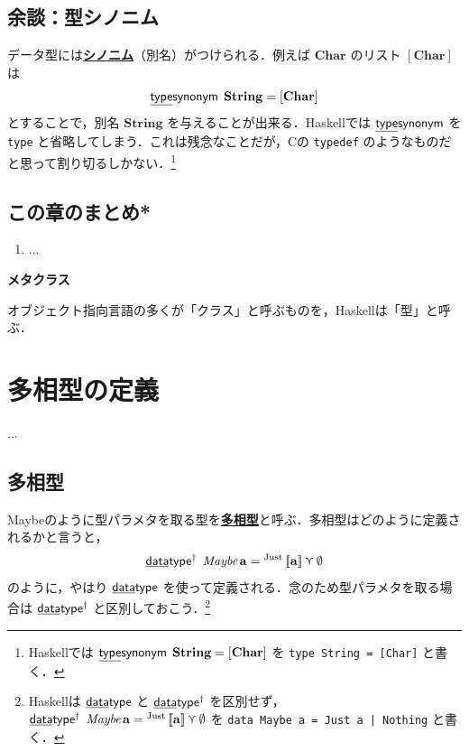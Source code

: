 \documentclass[a4paper,twocolumn]{jsbook}
\def\[{\left[\!\left[}
\def\]{\right]\!\right]}
\newcommand{\programminglanguage}[1]{\textsf{#1}}
\newcommand{\clang}{\programminglanguage{C}}
\newcommand{\haskell}{\programminglanguage{Haskell}}
\newenvironment{note}[1]{\begin{boxnote}\begin{center}\textbf{#1}\end{center}}{\end{boxnote}}
\newcommand{\keyword}[1]{{\underline{\textbf{#1}}}}
\newcommand{\code}[1]{\texttt{#1}}
\newcommand{\mKeyword}[1]{\mathsf{#1}} %
\newcommand{\mKeywordUnderline}[1]{\text{\underline{\textsf{#1}}}} %
\newcommand{\mDataTypeKeyword}{\mKeywordUnderline{data}\mKeyword{type}}
\newcommand{\mTypeSynonymKeyword}{\mKeywordUnderline{type}\mKeyword{synonym}}
\DeclareMathOperator{\mDataType}{\mDataTypeKeyword}
\DeclareMathOperator{\mDataTypeParametric}{\mDataTypeKeyword^\dagger}
\DeclareMathOperator{\mTypeSynonym}{\mTypeSynonymKeyword}
\newcommand{\mNothing}{\emptyset}
\DeclareMathOperator{\mValueOr}{\curlyvee}
\newcommand{\mType}[1]{\mathbf{#1}}
\newcommand{\mCharType}{\mType{Char}}
\newcommand{\mStringType}{\mType{String}}
\newcommand{\mListType}[1]{[\mType{#1}]}
\newcommand{\mTypeConstructor}[1]{\textit{#1}}
\DeclareMathOperator{\mMaybeTypeConstructor}{\mTypeConstructor{Maybe}}
\newcommand{\mGenericTypeAssemble}[2]{{}^{\mTypeConstructor{#1}}\[\mType{#2}\]}
\newcommand{\mMaybeType}[1]{\mGenericTypeAssemble{Maybe}{#1}}
\newcommand{\mGenericValueConstructor}[1]{\mathrm{#1}}
\newcommand{\mGenericWith}[2]{{}^\mGenericValueConstructor{#1}\[#2\]}
\newcommand{\mJustWith}[1]{\mGenericWith{Just}{#1}}
\begin{document}
\section{余談：型シノニム}

データ型には\keyword{シノニム}（別名）がつけられる．例えば $\mCharType$ のリスト $\mListType{\mCharType}$ は
\begin{equation}
\mTypeSynonym\;\mStringType=\mListType{\mCharType}
\end{equation}
とすることで，別名 $\mStringType$ を与えることが出来る．\haskell では $\mTypeSynonym$ を \code{type} と省略してしまう．これは残念なことだが，\clang の \code{typedef} のようなものだと思って割り切るしかない．\footnote{\haskell では $\mTypeSynonym\;\mStringType=\mListType{\mCharType}$ を \code{type String = [Char]} と書く．}

\section{この章のまとめ*}

\begin{enumerate}
\item ...
\end{enumerate}

\begin{note}{メタクラス}
オブジェクト指向言語の多くが「クラス」と呼ぶものを，\haskell は「型」と呼ぶ．


\end{note}


\chapter{多相型の定義}
\label{ch:parametric-data-type}
...

\section{多相型}

Maybeのように型パラメタを取る型を\keyword{多相型}と呼ぶ．多相型はどのように定義されるかと言うと，
\begin{equation}
\mDataTypeParametric\;\mMaybeTypeConstructor\mType{a}
=\mJustWith{\mType{a}}\mValueOr\mNothing
\end{equation}
のように，やはり $\mDataType$ を使って定義される．念のため型パラメタを取る場合は $\mDataTypeParametric$ と区別しておこう．\footnote{\haskell は $\mDataType$ と $\mDataTypeParametric$ を区別せず，$\mDataTypeParametric\;\mMaybeTypeConstructor\mType{a}
=\mJustWith{\mType{a}}\mValueOr\mNothing$ を \code{data Maybe a = Just a | Nothing} と書く．}
\end{document}
